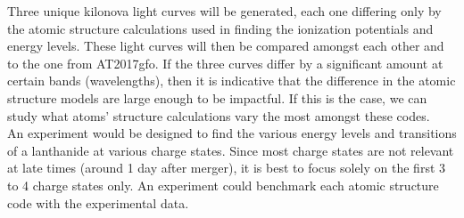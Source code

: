 \documentclass[11pt,a4paper]{article}
\begin{document}
Three unique kilonova light curves will be generated, each one differing only by the atomic structure calculations used in finding the ionization potentials and energy levels. These light curves will then be compared amongst each other and to the one from AT2017gfo. If the three curves differ by a significant amount at certain bands (wavelengths), then it is indicative that the difference in the atomic structure models are large enough to be impactful. If this is the case, we can study what atoms' structure calculations vary the most amongst these codes.\\  

An experiment would be designed to find the various energy levels and transitions of a lanthanide at various charge states. Since most charge states are not relevant at late times (around 1 day after merger), it is best to focus solely on the first 3 to 4 charge states only. An experiment could benchmark each atomic structure code with the experimental data.


\end{document}
